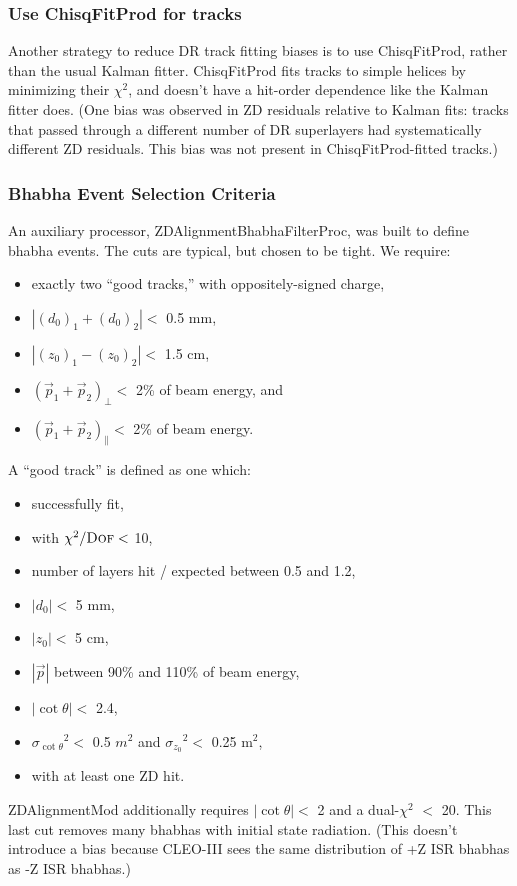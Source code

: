 \documentclass[12pt]{article}
\begin{document}
\subsubsection{Use ChisqFitProd for tracks}
Another strategy to reduce DR track fitting biases is to use
ChisqFitProd, rather than the usual Kalman fitter.  ChisqFitProd fits
tracks to simple helices by minimizing their $\chi^2$, and doesn't
have a hit-order dependence like the Kalman fitter does.  (One bias
was observed in ZD residuals relative to Kalman fits: tracks that
passed through a different number of DR superlayers had systematically
different ZD residuals.  This bias was not present in
ChisqFitProd-fitted tracks.)

\subsubsection{Bhabha Event Selection Criteria}
An auxiliary processor, ZDAlignmentBhabhaFilterProc, was built to
define bhabha events.  The cuts are typical, but chosen to be tight.
We require:
\begin{itemize}
  \item exactly two ``good tracks,'' with oppositely-signed charge,
  \item $|(d_0)_1 + (d_0)_2| <$ 0.5 mm,
  \item $|(z_0)_1 - (z_0)_2| <$ 1.5 cm,
  \item $(\vec{p}_1 + \vec{p}_2)_\perp <$ 2\% of beam energy, and
  \item $(\vec{p}_1 + \vec{p}_2)_\parallel <$ 2\% of beam energy.
\end{itemize}
A ``good track'' is defined as one which:
\begin{itemize}
  \item successfully fit,
  \item with $\chi^2/\mbox{\sc Dof} <$ 10,
  \item number of layers hit / expected between 0.5 and 1.2,
  \item $|d_0| <$ 5 mm,
  \item $|z_0| <$ 5 cm,
  \item $|\vec{p}|$ between 90\% and 110\% of beam energy,
  \item $|\cot \theta| <$ 2.4,
  \item ${\sigma_{\cot \theta}}^2 <$ 0.5 $m^2$ and
        ${\sigma_{z_0}}^2 <$ 0.25 m$^2$,
  \item with at least one ZD hit.
\end{itemize}
ZDAlignmentMod additionally requires $|\cot \theta| <$ 2 and a
dual-$\chi^2$ $<$ 20.  This last cut removes many bhabhas with initial
state radiation.  (This doesn't introduce a bias because CLEO-III sees
the same distribution of +Z ISR bhabhas as -Z ISR bhabhas.)
\end{document}
